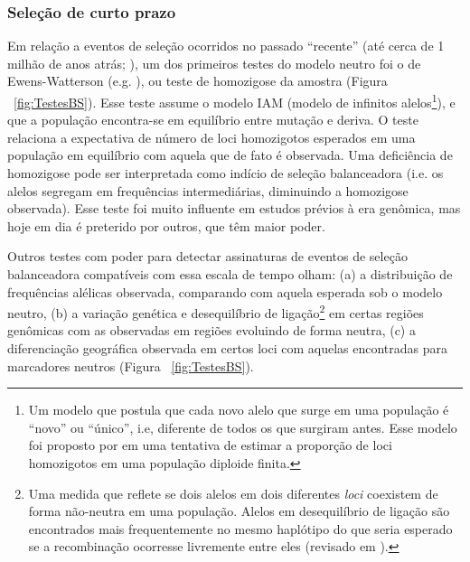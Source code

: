 \begin{refsection}
\subsubsection{Seleção de curto prazo}
    Em relação a eventos de seleção ocorridos no passado \enquote{recente} (até cerca de 1 milhão de anos atrás; \cite{Fu2013}), um dos primeiros testes do modelo neutro foi o de Ewens-Watterson (e.g. \cite{Watterson1978}), ou teste de homozigose da amostra (Figura ~\ref{fig:TestesBS}). Esse teste assume o modelo IAM (modelo de infinitos alelos\footnote{Um modelo que postula que cada novo alelo que surge em uma população é \enquote{novo} ou \enquote{único}, i.e, diferente de todos os que surgiram antes. Esse modelo foi proposto por \textcite{Kimura1964} em uma tentativa de estimar a proporção de loci homozigotos em uma população diploide finita.}), e que a população encontra-se em equilíbrio entre mutação e deriva. O teste relaciona a expectativa de número de loci homozigotos esperados em uma população em equilíbrio com aquela que de fato é observada. Uma deficiência de homozigose pode ser interpretada como indício de seleção balanceadora (i.e. os alelos segregam em frequências intermediárias, diminuindo a homozigose observada). Esse teste foi muito influente em estudos prévios à era genômica, mas hoje em dia é preterido por outros, que têm maior poder. %

    Outros testes com poder para detectar assinaturas de eventos de seleção balanceadora compatíveis com essa escala de tempo olham: (a) a distribuição de frequências alélicas observada, comparando com aquela esperada sob o modelo neutro, (b) a variação genética e desequilíbrio de ligação\footnote{Uma medida que reflete se dois alelos em dois diferentes \emph{loci} coexistem de forma não-neutra em uma população. Alelos em desequilíbrio de ligação são encontrados mais frequentemente no mesmo haplótipo do que seria esperado se a recombinação ocorresse livremente entre eles (revisado em \cite{Cutter2013}).} em certas regiões genômicas com as observadas em regiões evoluindo de forma neutra, (c) a diferenciação geográfica observada em certos loci com aquelas encontradas para marcadores neutros \parencite{Hedrick2006,Hedrick2012,Mitchell-Olds2007} (Figura ~\ref{fig:TestesBS}). 
%  


\end{refsection}
